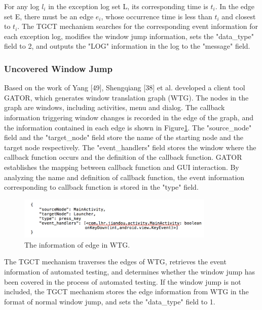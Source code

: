 For any log $l_{i}$ in the exception log set L, its corresponding time is $t_{i}$. In the edge set E, there must be an edge $e_{i}$, whose occurrence time is less than $t_{i}$ and closest to $t_{i}$. The TGCT mechanism searches for the corresponding event information for each exception log, modifies the window jump information, sets the "data\_type" field to 2, and outputs the "LOG" information in the log to the "message" field.

\subsubsection{Uncovered Window Jump}
Based on the work of Yang [49], Shengqiang [38] et al. developed a client tool GATOR, which generates window translation graph (WTG). The nodes in the graph are windows, including activities, menu and dialog. The callback information triggering window changes is recorded in the edge of the graph, and the information contained in each edge is shown in Figure\ref{fig:info}. The "source\_node" field and the "target\_node" field store the name of the starting node and the target node respectively. The "event\_handlers" field stores the window where the callback function occurs and the definition of the callback function. GATOR establishes the mapping between callback function and GUI interaction. By analyzing the name and definition of callback function, the event information corresponding to callback function is stored in the "type" field.
\begin{figure}[htbp]
\centering
\centerline{\includegraphics[width=\columnwidth,height=2cm]{fig/6.png}}
\caption{The information of edge in WTG.}
\label{fig:info}
\end{figure}

The TGCT mechanism traverses the edges of WTG, retrieves the event information of automated testing, and determines whether the window jump has been covered in the process of automated testing. If the window jump is not included, the TGCT mechanism stores the edge information from WTG in the format of normal window jump, and sets the "data\_type" field to 1. 

